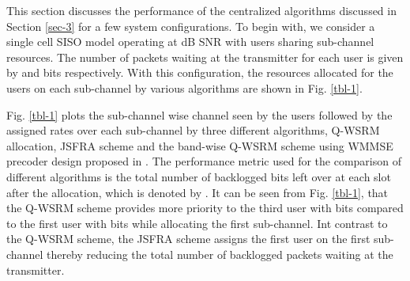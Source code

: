 
This section discusses the performance of the centralized algorithms discussed in Section \ref{sec-3} for a few system configurations. To begin with, we consider a single cell \ac{SISO} model operating at  dB \ac{SNR} with  users sharing  sub-channel resources. The number of packets waiting at the transmitter for each user is given by  and  bits respectively. With this configuration, the resources allocated for the users on each sub-channel by various algorithms are shown in Fig. \ref{tbl-1}.

Fig. \ref{tbl-1} plots the sub-channel wise channel seen by the users followed by the assigned rates over each sub-channel by three different algorithms, \ac{Q-WSRM} allocation, \ac{JSFRA} scheme and the band-wise \ac{Q-WSRM} scheme using \ac{WMMSE} precoder design proposed in \cite{wmmse_shi}. The performance metric used for the comparison of different algorithms is the total number of backlogged bits left over at each slot after the allocation, which is denoted by . It can be seen from Fig. \ref{tbl-1}, that the \ac{Q-WSRM} scheme provides more priority to the third user with  bits compared to the first user with  bits while allocating the first sub-channel. Int contrast to the \ac{Q-WSRM} scheme, the \ac{JSFRA} scheme assigns the first user on the first sub-channel thereby reducing the total number of backlogged packets waiting at the transmitter.
